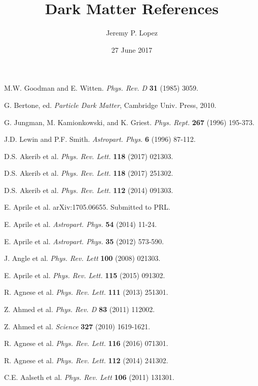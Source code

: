 \documentclass{article}
\title{Dark Matter References}
\author{Jeremy P. Lopez}
\date{27 June 2017}
\begin{document}
\begin{thebibliography}{100}


M.W. Goodman and E. Witten. \textit{Phys. Rev. D} \textbf{31} (1985) 3059.

G. Bertone, ed. \textit{Particle Dark Matter}, Cambridge Univ. Press, 2010.

G. Jungman, M. Kamionkowski, and K. Griest. \textit{Phys. Rept.} \textbf{267} (1996) 195-373.

J.D. Lewin and P.F. Smith. \textit{Astropart. Phys.} \textbf{6} (1996) 87-112.


D.S. Akerib et al. \textit{Phys. Rev. Lett.} \textbf{118} (2017) 021303.

D.S. Akerib et al. \textit{Phys. Rev. Lett.} \textbf{118} (2017) 251302.

D.S. Akerib et al. \textit{Phys. Rev. Lett.} \textbf{112} (2014) 091303.

E. Aprile et al. arXiv:1705.06655. Submitted to PRL.

E. Aprile et al. \textit{Astropart. Phys.} \textbf{54} (2014) 11-24.

E. Aprile et al. \textit{Astropart. Phys.} \textbf{35} (2012) 573-590.

J. Angle et al. \textit{Phys. Rev. Lett} \textbf{100} (2008) 021303.

E. Aprile et al. \textit{Phys. Rev. Lett.} \textbf{115} (2015) 091302.


R. Agnese et al. \textit{Phys. Rev. Lett.} \textbf{111} (2013) 251301.

Z. Ahmed et al. \textit{Phys. Rev. D} \textbf{83} (2011) 112002.

Z. Ahmed et al. \textit{Science} \textbf{327} (2010) 1619-1621.

R. Agnese et al. \textit{Phys. Rev. Lett.} \textbf{116} (2016) 071301.

R. Agnese et al. \textit{Phys. Rev. Lett.} \textbf{112} (2014) 241302.

C.E. Aalseth et al. \textit{Phys. Rev. Lett} \textbf{106} (2011) 131301.


\end{thebibliography}
\end{document}
